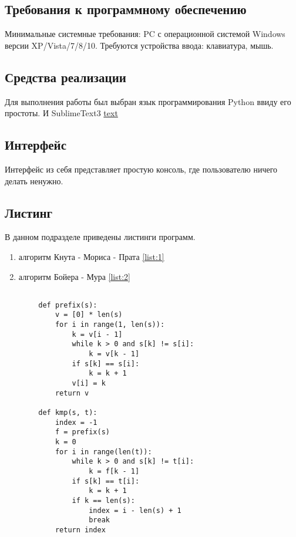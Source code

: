 \documentclass[../main.tex]{subfiles}
\begin{document}
	
\subsection{Требования к программному обеспечению}

	Минимальные системные требования: PC с операционной системой Windows версии XP/Vista/7/8/10. Требуются устройства ввода: клавиатура, мышь. 

\subsection{Средства реализации}

	Для выполнения работы был выбран язык программирования Python ввиду его простоты. И SublimeText3 \href{https://www.sublimetext.com/}{text}

\subsection{Интерфейс}

	Интерфейс из себя представляет простую консоль, где пользователю ничего делать ненужно.
	
\subsection{Листинг}
	
	В данном подразделе приведены листинги программ.
	\begin{enumerate}
		\item алгоритм Кнута - Мориса - Прата \ref{list:1}
		\item алгоритм Бойера - Мура \ref{list:2}
	\end{enumerate}

	\begin{lstlisting}[caption=Алгоритм Кнута-Мориса-Прата, label=list:1]
	
		def prefix(s):
		    v = [0] * len(s)
		    for i in range(1, len(s)):
		        k = v[i - 1]
		        while k > 0 and s[k] != s[i]:
		            k = v[k - 1]
		        if s[k] == s[i]:
		            k = k + 1
		        v[i] = k
		    return v

		def kmp(s, t):
		    index = -1
		    f = prefix(s)
		    k = 0
		    for i in range(len(t)):
		        while k > 0 and s[k] != t[i]:
		            k = f[k - 1]
		        if s[k] == t[i]:
		            k = k + 1
		        if k == len(s):
		            index = i - len(s) + 1
		            break
		    return index
	\end{lstlisting}
	
\end{document}
